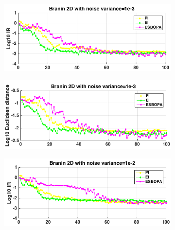 \documentclass[a4paper,11pt]{report}
\begin{document}
\begin{figure} [H]
\label{BraninnoisyIRandL2}
	\begin{subfigure}{.5\textwidth}
		  \centering
		  \includegraphics[width=1\linewidth]{Branin15noise1e-3_sigma100_ESBOPA_V4_IR.png}
	\end{subfigure}
	\begin{subfigure}{.5\textwidth}
 		 \centering
 		 \includegraphics[width=1\linewidth]{Branin15noise1e-3_sigma100_ESBOPA_V4_Xnorm.png}
	\end{subfigure}	
	\begin{subfigure}{.5\textwidth}
		  \centering
		  \includegraphics[width=1\linewidth]{Branin15noise1e-2_sigma100_ESBOPA_V4_IR.png}
	\end{subfigure}

\end{figure}
\end{document}
